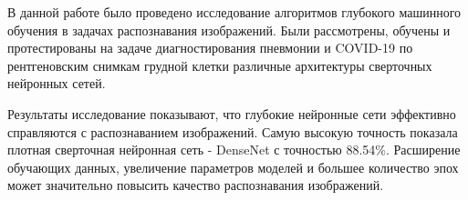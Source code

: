 В данной работе было проведено исследование алгоритмов глубокого машинного обучения в задачах распознавания изображений. Были рассмотрены, обучены и протестированы на задаче диагностирования пневмонии и COVID-19 по рентгеновским снимкам грудной клетки различные архитектуры сверточных нейронных сетей. 

Результаты исследование показывают, что глубокие нейронные сети эффективно справляются с распознаванием изображений. Самую высокую точность показала плотная сверточная нейронная сеть - DenseNet с точностью 88.54\%.
Расширение обучающих данных, увеличение параметров моделей и большее количество эпох может значительно повысить качество распознавания изображений.

\clearpage